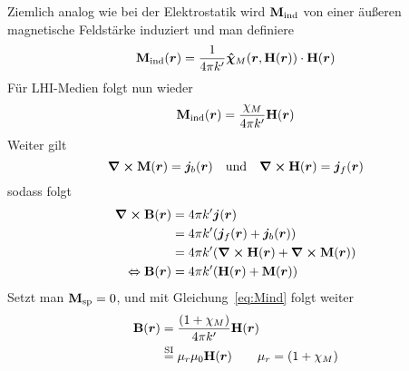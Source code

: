 Ziemlich analog wie bei der Elektrostatik wird $\vb M_\text{ind}$ von einer äußeren magnetische Feldstärke induziert und man definiere
\begin{equation}
  \vb M_\text{ind}(\vb*r) = \frac{1}{4\pi k'}\vu*\chi_{M}(\vb*r, \vb H(\vb*r)) \cdot \vb H(\vb*r)
\end{equation}
Für LHI-Medien folgt nun wieder
\begin{equation}
  \label{eq:Mind}
  \vb M_\text{ind}(\vb*r) = \frac{\chi_M}{4\pi k'}\vb H(\vb*r) 
\end{equation}
Weiter gilt
\begin{equation}
  \curl \vb M(\vb*r) = \vb*j_b(\vb*r)
  \quad\text{und}\quad
  \curl \vb H(\vb*r) = \vb*j_f(\vb*r)
\end{equation}
sodass folgt
\begin{equation}
  \begin{split}
    \curl\vb B(\vb*r) 
    &= 4\pi k'\vb*j(\vb*r)\\ 
    &= 4\pi k'(\vb*j_f(\vb*r) +  \vb*j_b(\vb*r))\\
    &= 4\pi k'(\curl \vb H(\vb*r) + \curl \vb M(\vb*r))\\
    \Leftrightarrow \vb B(\vb*r) &= 4\pi k' (\vb H(\vb*r) + \vb M(\vb*r)) 
  \end{split}
\end{equation}
Setzt man $\vb M_\text{sp}=0$, und mit Gleichung~\ref{eq:Mind}
folgt weiter
\begin{equation}
  \begin{split}
    \vb B(\vb*r) &=  \frac{(1+\chi_M)}{4\pi k'} \vb H(\vb*r)\\
               &\stackrel{\text{SI}}{=} \mu_r\mu_0 \vb H(\vb*r) \qquad \mu_r=(1+\chi_M)
  \end{split}
\end{equation}

